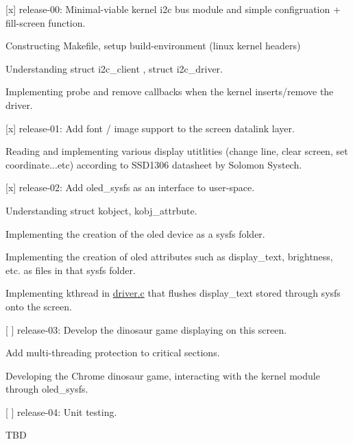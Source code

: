 \begin{DoxyItemize}
\item \mbox{[}x\mbox{]} release-\/00\+: Minimal-\/viable kernel i2c bus module and simple configruation + fill-\/screen function.
\begin{DoxyItemize}
\item Constructing Makefile, setup build-\/environment (linux kernel headers)
\item Understanding struct i2c\+\_\+client , struct i2c\+\_\+driver.
\item Implementing probe and remove callbacks when the kernel inserts/remove the driver.
\end{DoxyItemize}
\item \mbox{[}x\mbox{]} release-\/01\+: Add font / image support to the screen datalink layer.
\begin{DoxyItemize}
\item Reading and implementing various display utitlities (change line, clear screen, set coordinate...etc) according to S\+S\+D1306 datasheet by Solomon Systech.
\end{DoxyItemize}
\item \mbox{[}x\mbox{]} release-\/02\+: Add oled\+\_\+sysfs as an interface to user-\/space.
\begin{DoxyItemize}
\item Understanding struct kobject, kobj\+\_\+attrbute.
\item Implementing the creation of the oled device as a sysfs folder.
\item Implementing the creation of oled attributes such as display\+\_\+text, brightness, etc. as files in that sysfs folder.
\item Implementing kthread in \hyperlink{driver_8c}{driver.\+c} that flushes display\+\_\+text stored through sysfs onto the screen.
\end{DoxyItemize}
\item \mbox{[} \mbox{]} release-\/03\+: Develop the dinosaur game displaying on this screen.
\begin{DoxyItemize}
\item Add multi-\/threading protection to critical sections.
\item Developing the Chrome dinosaur game, interacting with the kernel module through oled\+\_\+sysfs.
\end{DoxyItemize}
\item \mbox{[} \mbox{]} release-\/04\+: Unit testing.
\begin{DoxyItemize}
\item T\+BD 
\end{DoxyItemize}
\end{DoxyItemize}